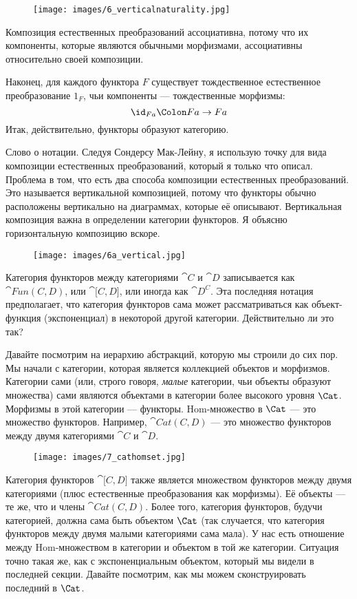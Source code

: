 \begin{figure}[H]
  \centering
  \texttt{[image: images/6\_verticalnaturality.jpg]}
\end{figure}

\noindent
Композиция естественных преобразований ассоциативна, потому что их
компоненты, которые являются обычными морфизмами, ассоциативны относительно
своей композиции.

Наконец, для каждого функтора $F$ существует тождественное естественное преобразование
$1_F$, чьи компоненты --- тождественные морфизмы:
\[\id_{F a} \Colon F a \to F a\]
Итак, действительно, функторы образуют категорию.

Слово о нотации. Следуя Сондерсу Мак-Лейну, я использую точку для
вида композиции естественных преобразований, который я только что описал.
Проблема в том, что есть два способа композиции естественных преобразований.
Это называется вертикальной композицией, потому что функторы обычно
расположены вертикально на диаграммах, которые её описывают. Вертикальная
композиция важна в определении категории функторов. Я объясню
горизонтальную композицию вскоре.

\begin{figure}[H]
  \centering
  \texttt{[image: images/6a\_vertical.jpg]}
\end{figure}

\noindent
Категория функторов между категориями $\cat{C}$ и $\cat{D}$ записывается как
$\cat{Fun(C, D)}$, или $\cat{{[}C, D{]}}$, или иногда как
$\cat{D^C}$. Эта последняя нотация предполагает, что категория функторов сама
может рассматриваться как объект-функция (экспоненциал) в некоторой другой
категории. Действительно ли это так?

Давайте посмотрим на иерархию абстракций, которую мы строили
до сих пор. Мы начали с категории, которая является коллекцией
объектов и морфизмов. Категории сами (или, строго говоря,
\emph{малые} категории, чьи объекты образуют множества) сами являются объектами
в категории более высокого уровня $\Cat$. Морфизмы в этой категории ---
функторы. Hom-множество в $\Cat$ --- это множество функторов. Например,
$\cat{Cat(C, D)}$ --- это множество функторов между двумя категориями $\cat{C}$ и $\cat{D}$.

\begin{figure}[H]
  \centering
  \texttt{[image: images/7\_cathomset.jpg]}
\end{figure}

\noindent
Категория функторов $\cat{{[}C, D{]}}$ также является множеством функторов между двумя
категориями (плюс естественные преобразования как морфизмы). Её объекты ---
те же, что и члены $\cat{Cat(C, D)}$. Более того, категория функторов,
будучи категорией, должна сама быть объектом $\Cat$ (так
случается, что категория функторов между двумя малыми категориями сама
мала). У нас есть отношение между Hom-множеством в категории и
объектом в той же категории. Ситуация точно такая же, как с
экспоненциальным объектом, который мы видели в последней секции. Давайте посмотрим, как мы
можем сконструировать последний в $\Cat$.

